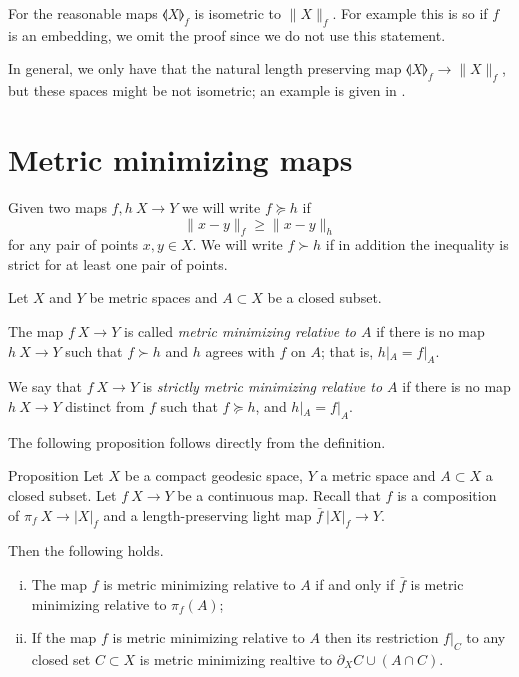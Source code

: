 \documentclass{article}
\begin{document}
For the reasonable maps $\llangle X\rrangle_f$ is isometric to $\|X\|_f$.
For example this is so if $f$ is an embedding, we omit the proof since we do not use this statement.

In general, we only have that the natural length preserving map $\llangle X\rrangle_f\to \|X\|_f$,
but these spaces might be not isometric;
an example is given in \cite[4.2]{petrunin-intrinisic}.


\section{Metric minimizing maps}\label{Metric minimizing maps}
Given two maps $f,h\:X\to Y$ we will write $f\succcurlyeq h$ if 
\[\|x-y\|_f\ge \|x-y\|_h\]
for any pair of points $x,y\in X$.
We will write $f\succ h$ if in addition the inequality is strict for at least one pair of points.


Let $X$ and $Y$ be metric spaces and $A\subset X$ be a closed subset.

The map $f\:X\to Y$ is called \emph{metric minimizing relative to $A$}
if there is no map $h\:X\to Y$ such that $f\succ h$
and $h$ agrees with $f$ on $A$;
that is, $h|_A=f|_A$.

We say that $f\:X\to Y$ is \emph{strictly metric minimizing relative to $A$}
if there is no map $h\:X\to Y$ distinct from $f$
such that $f\succcurlyeq h$, 
and $h|_A=f|_A$.

The following proposition follows directly from the definition.

\begin{thm}{Proposition}\label{prop:memicrit}
Let $X$ be a compact geodesic space, $Y$ a metric space 
and $A\subset X$ a closed subset.
Let $f\:X\to Y$ be a continuous map.
Recall that 
$f$ is a composition of $\pi_f\: X\to|X|_f$ and a length-preserving light map $\bar f\:|X|_f\to Y$.

Then the following holds.
\begin{enumerate}[(i)]
\item The map $f$ is metric minimizing relative to $A$
if and only if $\bar f$ is metric minimizing relative to $\pi_f(A)$;
\item\label{prop:memicrit:retriction} If the map $f$ is metric minimizing relative to $A$ then its restriction
$f|_C$ to any closed set $C\subset X$ is metric minimizing realtive to $\partial_X C\cup (A\cap C)$.
\end{enumerate}

\end{thm}
\end{document}
